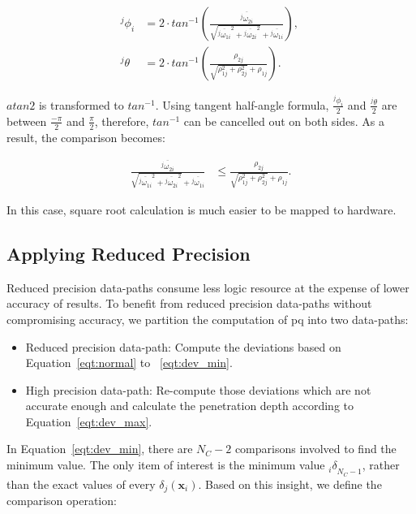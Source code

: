 \begin{equation}
\begin{aligned}
{^j\phi}_i &= 2 \cdot tan^{-1} \left ( \frac{\overline{{^j\omega}_{2i}}}{\sqrt{\overline{{^j\omega}_{1i}}^2+\overline{{^j\omega}_{2i}}^2}+\overline{{^j\omega}_{1i}}} \right ) \mbox{, } \\
{^j\theta} &= 2 \cdot tan^{-1} \left ( \frac{\rho_{2j}}{\sqrt{\rho_{1j}^2+\rho_{2j}^2}+\rho_{1j}} \right ) \mbox{.}
\end{aligned}
\label{eqt:check2}
\end{equation}

$atan2$ is transformed to $tan^{-1}$.
Using tangent half-angle formula, $\frac{{^j\phi}_i}{2}$ and $\frac{{^j\theta}}{2}$ are between $\frac{-\pi}{2}$ and $\frac{\pi}{2}$, 
therefore, $tan^{-1}$ can be cancelled out on both sides.
As a result, the comparison becomes:

\begin{equation}
\begin{aligned}
\frac{\overline{{^j\omega}_{2i}}}{\sqrt{\overline{{^j\omega}_{1i}}^2+\overline{{^j\omega}_{2i}}^2}+\overline{{^j\omega}_{1i}}} &\le \frac{\rho_{2j}}{\sqrt{\rho_{1j}^2+\rho_{2j}^2}+\rho_{1j}} \mbox{.}
\end{aligned}
\label{eqt:check3}
\end{equation}

In this case, square root calculation is much easier to be mapped to hardware.

\subsection{Applying Reduced Precision}
\label{sec:precision_mixed_precision}
Reduced precision data-paths consume less logic resource at the expense of lower accuracy of results.
To benefit from reduced precision data-paths without compromising accuracy, we partition the computation of \gls{pq} into two data-paths:

\begin{itemize}
\item Reduced precision data-path: Compute the deviations based on Equation~\ref{eqt:normal} to ~\ref{eqt:dev_min}.
\item High precision data-path: Re-compute those deviations which are not accurate enough and calculate the penetration depth according to Equation~\ref{eqt:dev_max}.
\end{itemize}

In Equation~\ref{eqt:dev_min}, there are $N_C-2$ comparisons involved to find the minimum value.
The only item of interest is the minimum value ${_i\delta}_{N_C-1}$, rather than the exact values of every $\delta_{j}(\textbf{x}_i)$.
Based on this insight, we define the comparison operation:

